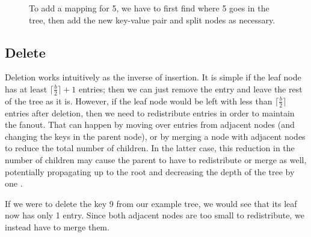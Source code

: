 \documentclass[a4paper,12pt]{article}
\begin{document}
\begin{figure}[h]
    \centering
    \caption{To add a mapping for 5, we have to first find where 5 goes in the tree, then add the new key-value pair and split nodes as necessary.}
    \label{fig:demotree3}
\end{figure}

\subsection{Delete}

Deletion works intuitively as the inverse of insertion. It is simple if the leaf node has at least $\lceil \frac{b}{2} \rceil + 1$ entries; then we can just remove the entry and leave the rest of the tree as it is. However, if the leaf node would be left with less than $\lceil \frac{b}{2} \rceil$ entries after deletion, then we need to redistribute entries in order to maintain the fanout. That can happen by moving over entries from adjacent nodes (and changing the keys in the parent node), or by merging a node with adjacent nodes to reduce the total number of children. In the latter case, this reduction in the number of children may cause the parent to have to redistribute or merge as well, potentially propagating up to the root and decreasing the depth of the tree by one \cite{elmasri_navathe_2011}.

If we were to delete the key 9 from our example tree, we would see that its leaf now has only 1 entry. Since both adjacent nodes are too small to redistribute, we instead have to merge them.
\end{document}
